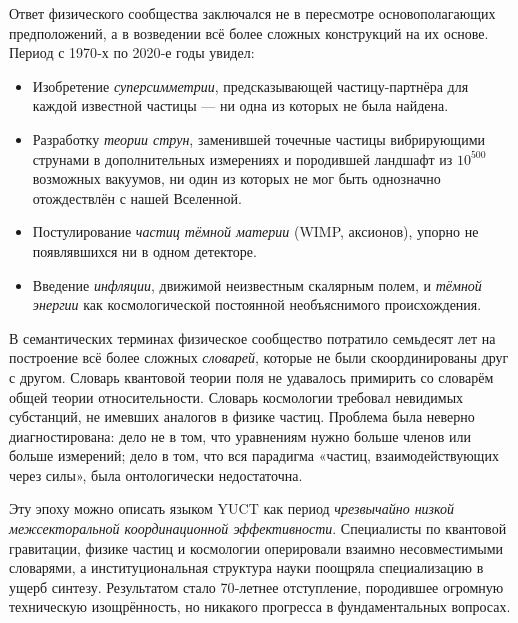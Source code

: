 \documentclass[12pt,a4paper]{article}
\begin{document}
	Ответ физического сообщества заключался не в пересмотре основополагающих предположений, а в возведении всё более сложных конструкций на их основе. Период с 1970‑х по 2020‑е годы увидел:
	\begin{itemize}
		\item Изобретение \emph{суперсимметрии}, предсказывающей частицу-партнёра для каждой известной частицы — ни одна из которых не была найдена.
		\item Разработку \emph{теории струн}, заменившей точечные частицы вибрирующими струнами в дополнительных измерениях и породившей ландшафт из \(10^{500}\) возможных вакуумов, ни один из которых не мог быть однозначно отождествлён с нашей Вселенной.
		\item Постулирование \emph{частиц тёмной материи} (WIMP, аксионов), упорно не появлявшихся ни в одном детекторе.
		\item Введение \emph{инфляции}, движимой неизвестным скалярным полем, и \emph{тёмной энергии} как космологической постоянной необъяснимого происхождения.
	\end{itemize}
	
	В семантических терминах физическое сообщество потратило семьдесят лет на построение всё более сложных \emph{словарей}, которые не были скоординированы друг с другом. Словарь квантовой теории поля не удавалось примирить со словарём общей теории относительности. Словарь космологии требовал невидимых субстанций, не имевших аналогов в физике частиц. Проблема была неверно диагностирована: дело не в том, что уравнениям нужно больше членов или больше измерений; дело в том, что вся парадигма «частиц, взаимодействующих через силы», была онтологически недостаточна.
	
	Эту эпоху можно описать языком YUCT как период \emph{чрезвычайно низкой межсекторальной координационной эффективности}. Специалисты по квантовой гравитации, физике частиц и космологии оперировали взаимно несовместимыми словарями, а институциональная структура науки поощряла специализацию в ущерб синтезу. Результатом стало 70‑летнее отступление, породившее огромную техническую изощрённость, но никакого прогресса в фундаментальных вопросах.
	
\end{document}
